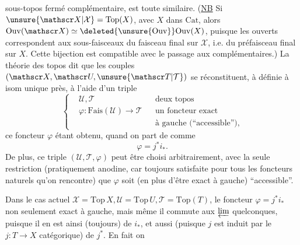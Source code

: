 sous-topos fermé complémentaire, est toute similaire.
(\uline{NB} Si $\unsure{\mathscr X|\mathcal X}=\mathrm{Top}(X)$, avec $X$ dans $\mathrm{Cat}$, alors $\mathrm{Ouv}(\mathscr X)\simeq\deleted{\unsure{\mathrm{Ouv}}}\mathrm{Ouv}(X)$, puisque les ouverts correspondent aux sous-faisceaux du faisceau final sur $\mathscr X$, i.e. du préfaisceau final sur $X$. Cette bijection est compatible avec le passage aux complémentaires.)
La théorie des topos dit que les couples $(\mathscr X,\mathscr U,\unsure{\mathscr T|\mathcal T})$ se réconstituent, à  définie à isom unique près, à l'aide d'un triple
\[
\left\{\begin{aligned}&\mathscr U,\mathscr T&&\text{deux topos}\\ &\varphi:\mathrm{Fais}(\mathscr U)\longrightarrow\mathscr T &&\text{un foncteur exact}\\ &&&\text{à gauche (``accessible''),}\end{aligned}\right.
\]
ce foncteur $\varphi$ étant obtenu, quand on part de
comme
\[
\varphi=j^*i_*.
\]
De plus, ce triple $(\mathscr U,\mathscr T,\varphi)$ peut être choisi arbitrairement, avec la seule restriction (pratiquement anodine, car toujours satisfaite pour tous les foncteurs naturels qu'on rencontre) que $\varphi$ soit (en plus d'être exact à gauche) ``accessible''.

Dans le cas actuel  $\mathscr X=\mathrm{Top}\,X,\mathscr U=\mathrm{Top}\,U,\mathscr T=\mathrm{Top}(T)$, le foncteur  $\varphi=j^*i_*$  non seulement exact à gauche, mais même il commute aux $\varprojlim$ quelconques, puisque il en est ainsi (toujours) de $i_*$, et aussi (puisque  $j$  est induit par le $j:T\longrightarrow X$ catégorique) de $j^*$. En fait on
